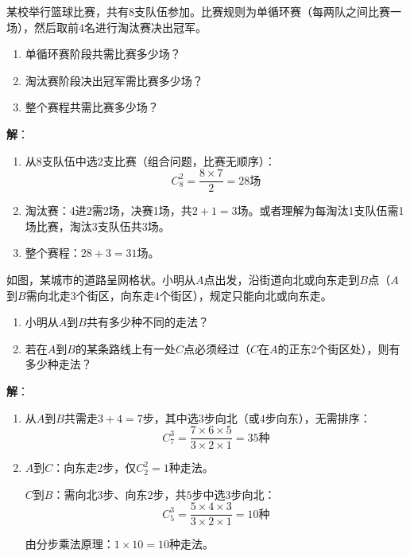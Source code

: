 \documentclass[12pt, a4paper]{ctexart}
\begin{document}
\begin{appbox}[【应用2】比赛场次问题]
某校举行篮球比赛，共有8支队伍参加。比赛规则为单循环赛（每两队之间比赛一场），然后取前4名进行淘汰赛决出冠军。
\begin{enumerate}[label=(\arabic*)]
  \item 单循环赛阶段共需比赛多少场？
  \item 淘汰赛阶段决出冠军需比赛多少场？
  \item 整个赛程共需比赛多少场？
\end{enumerate}

\textbf{解}：
\begin{enumerate}[label=(\arabic*)]
  \item 从8支队伍中选2支比赛（组合问题，比赛无顺序）：
  \[
  C_8^2 = \frac{8 \times 7}{2} = 28 \text{场}
  \]
  \item 淘汰赛：4进2需2场，决赛1场，共$2 + 1 = 3$场。或者理解为每淘汰1支队伍需1场比赛，淘汰3支队伍共$3$场。
  \item 整个赛程：$28 + 3 = 31$场。
\end{enumerate}
\end{appbox}

\begin{appbox}[【应用3】路线选择问题]
如图，某城市的道路呈网格状。小明从$A$点出发，沿街道向北或向东走到$B$点（$A$到$B$需向北走3个街区，向东走4个街区），规定只能向北或向东走。

\begin{enumerate}[label=(\arabic*)]
  \item 小明从$A$到$B$共有多少种不同的走法？
  \item 若在$A$到$B$的某条路线上有一处$C$点必须经过（$C$在$A$的正东2个街区处），则有多少种走法？
\end{enumerate}

\textbf{解}：
\begin{enumerate}[label=(\arabic*)]
  \item 从$A$到$B$共需走$3 + 4 = 7$步，其中选$3$步向北（或$4$步向东），无需排序：
  \[
  C_7^3 = \frac{7 \times 6 \times 5}{3 \times 2 \times 1} = 35 \text{种}
  \]

  \item $A$到$C$：向东走2步，仅$C_2^2 = 1$种走法。

  $C$到$B$：需向北$3$步、向东$2$步，共$5$步中选$3$步向北：
  \[
  C_5^3 = \frac{5 \times 4 \times 3}{3 \times 2 \times 1} = 10 \text{种}
  \]

  由分步乘法原理：$1 \times 10 = 10$种走法。
\end{enumerate}
\end{appbox}
\end{document}

